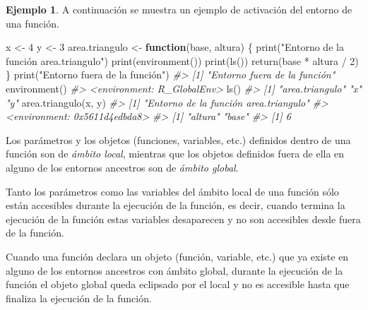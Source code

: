 \documentclass[
]{book}
\newenvironment{Shaded}{\begin{snugshade}}{\end{snugshade}}
\newcommand{\CommentTok}[1]{\textcolor[rgb]{0.56,0.35,0.01}{\textit{#1}}}
\newcommand{\ControlFlowTok}[1]{\textcolor[rgb]{0.13,0.29,0.53}{\textbf{#1}}}
\newcommand{\DecValTok}[1]{\textcolor[rgb]{0.00,0.00,0.81}{#1}}
\newcommand{\FunctionTok}[1]{\textcolor[rgb]{0.00,0.00,0.00}{#1}}
\newcommand{\NormalTok}[1]{#1}
\newcommand{\OtherTok}[1]{\textcolor[rgb]{0.56,0.35,0.01}{#1}}
\newcommand{\SpecialCharTok}[1]{\textcolor[rgb]{0.00,0.00,0.00}{#1}}
\newcommand{\StringTok}[1]{\textcolor[rgb]{0.31,0.60,0.02}{#1}}
\theoremstyle{definition}
\theoremstyle{definition}
\newtheorem{example}{Ejemplo}[chapter]
\theoremstyle{definition}
\theoremstyle{definition}
\theoremstyle{remark}
\begin{document}
\begin{example}

A continuación se muestra un ejemplo de activación del entorno de una función.

\begin{Shaded}
\begin{Highlighting}[]
\NormalTok{x }\OtherTok{\textless{}{-}} \DecValTok{4}
\NormalTok{y }\OtherTok{\textless{}{-}} \DecValTok{3}
\NormalTok{area.triangulo }\OtherTok{\textless{}{-}} \ControlFlowTok{function}\NormalTok{(base, altura) \{}
  \FunctionTok{print}\NormalTok{(}\StringTok{"Entorno de la función area.triangulo"}\NormalTok{) }
  \FunctionTok{print}\NormalTok{(}\FunctionTok{environment}\NormalTok{())}
  \FunctionTok{print}\NormalTok{(}\FunctionTok{ls}\NormalTok{())}
  \FunctionTok{return}\NormalTok{(base }\SpecialCharTok{*}\NormalTok{ altura }\SpecialCharTok{/} \DecValTok{2}\NormalTok{)}
\NormalTok{\}}
\FunctionTok{print}\NormalTok{(}\StringTok{"Entorno fuera de la función"}\NormalTok{)}
\CommentTok{\#\textgreater{} [1] "Entorno fuera de la función"}
\FunctionTok{environment}\NormalTok{()}
\CommentTok{\#\textgreater{} \textless{}environment: R\_GlobalEnv\textgreater{}}
\FunctionTok{ls}\NormalTok{()}
\CommentTok{\#\textgreater{} [1] "area.triangulo" "x"              "y"}
\FunctionTok{area.triangulo}\NormalTok{(x, y)}
\CommentTok{\#\textgreater{} [1] "Entorno de la función area.triangulo"}
\CommentTok{\#\textgreater{} \textless{}environment: 0x5611d4edbda8\textgreater{}}
\CommentTok{\#\textgreater{} [1] "altura" "base"}
\CommentTok{\#\textgreater{} [1] 6}
\end{Highlighting}
\end{Shaded}

\end{example}

Los parámetros y los objetos (funciones, variables, etc.) definidos dentro de una función son de \emph{ámbito local}, mientras que los objetos definidos fuera de ella en alguno de los entornos ancestros son de \emph{ámbito global}.

Tanto los parámetros como las variables del ámbito local de una función sólo están accesibles durante la ejecución de la función, es decir, cuando termina la ejecución de la función estas variables desaparecen y no son accesibles desde fuera de la función.

Cuando una función declara un objeto (función, variable, etc.) que ya existe en alguno de los entornos ancestros con ámbito global, durante la ejecución de la función el objeto global queda eclipsado por el local y no es accesible hasta que finaliza la ejecución de la función.
\end{document}
